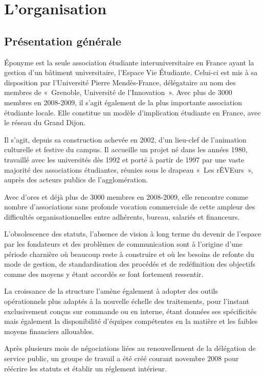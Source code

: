 \section{L'organisation}

\subsection{Présentation générale}
\label{presentation}

Éponyme est la seule association étudiante interuniversitaire en France
ayant la gestion d'un bâtiment universitaire, l'Espace Vie Étudiante.
Celui-ci est mis à sa disposition par l'Université Pierre Mendès-France,
délégataire au nom des membres de «~Grenoble, Université de l'Innovation~».
Avec plus de 3000 membres en 2008-2009, il s'agit également de la plus
importante association étudiante locale. Elle constitue un modèle
d'implication étudiante en France, avec le réseau du Grand Dijon.

Il s'agit, depuis sa construction achevée en 2002, d'un lieu-clef de
l'animation culturelle et festive du campus. Il accueille un projet né
dans les années 1980, travaillé avec les universités dès 1992 et porté à
partir de 1997 par une vaste majorité des associations étudiantes,
réunies sous le drapeau «~Les rÊVEurs~», auprès des acteurs publics de
l'agglomération.

Avec d'ores et déjà plus de 3000 membres en 2008-2009, elle rencontre comme
nombre d'associations sans profonde vocation commerciale de cette ampleur des
difficultés organisationnelles entre adhérents, bureau, salariés et
financeurs.

L'obsolescence des statuts, l'absence de vision à long terme du devenir de l'espace
par les fondateurs et des problèmes de communication sont à l'origine d'une
période charnière où beaucoup reste à construire et où les besoins de
refonte du mode de gestion, de standardisation des procédés et de redéfinition
des objectifs comme des moyens y étant accordés se font fortement ressentir.

La croissance de la structure l'amène également à adopter des outils
o\-pé\-ra\-tion\-nels plus adaptés à la nouvelle échelle des traitements, pour
l'instant exclusivement conçus sur commande ou en interne, étant données ses
spécificités mais également la disponibilité d'équipes compétentes en la
matière et les faibles moyens financiers allouables.

Après plusieurs mois de négociations liées au renouvellement de la délégation
de service public, un groupe de travail a été créé courant novembre
2008 pour réécrire les statuts et établir un réglement intérieur.

